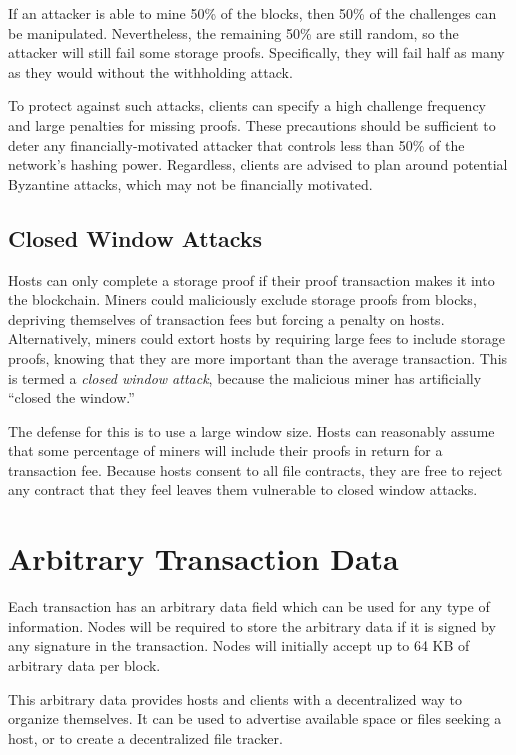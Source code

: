 \documentclass[twocolumn]{article}
\begin{document}
If an attacker is able to mine 50\% of the blocks, then 50\% of the challenges can be manipulated.
Nevertheless, the remaining 50\% are still random, so the attacker will still fail some storage proofs.
Specifically, they will fail half as many as they would without the withholding attack.

To protect against such attacks, clients can specify a high challenge frequency and large penalties for missing proofs.
These precautions should be sufficient to deter any financially-motivated attacker that controls less than 50\% of the network's hashing power.
Regardless, clients are advised to plan around potential Byzantine attacks, which may not be financially motivated.

\subsection{Closed Window Attacks}
Hosts can only complete a storage proof if their proof transaction makes it into the blockchain.
Miners could maliciously exclude storage proofs from blocks, depriving themselves of transaction fees but forcing a penalty on hosts.
Alternatively, miners could extort hosts by requiring large fees to include storage proofs, knowing that they are more important than the average transaction.
This is termed a \textit{closed window attack}, because the malicious miner has artificially ``closed the window.''

The defense for this is to use a large window size.
Hosts can reasonably assume that some percentage of miners will include their proofs in return for a transaction fee.
Because hosts consent to all file contracts, they are free to reject any contract that they feel leaves them vulnerable to closed window attacks.

\section{Arbitrary Transaction Data}
Each transaction has an arbitrary data field which can be used for any type of information.
Nodes will be required to store the arbitrary data if it is signed by any signature in the transaction.
Nodes will initially accept up to 64 KB of arbitrary data per block.

This arbitrary data provides hosts and clients with a decentralized way to organize themselves.
It can be used to advertise available space or files seeking a host, or to create a decentralized file tracker.
\end{document}

